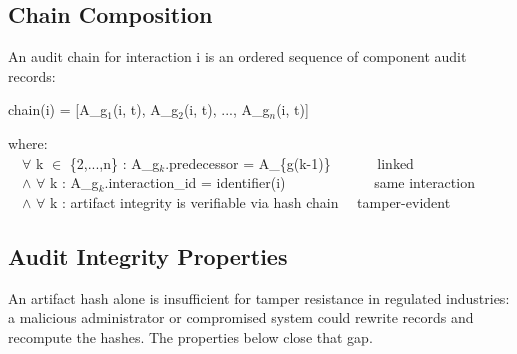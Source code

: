 \subsection{Chain Composition}


\begin{cdef}
An audit chain for interaction i is an ordered sequence of component audit records:

\begin{claddisp}
chain(i) = [A\_g$_1$(i, t), A\_g$_2$(i, t), ..., A\_g$_n$(i, t)]\\
\end{claddisp}
\begin{cladnote}
where:\\
~~$\forall$ k $\in$ \{2,...,n\} : A\_g$_k$.predecessor = A\_\{g(k-1)\}~~~~~~\textemdash{} linked\\
~~$\wedge$ $\forall$ k : A\_g$_k$.interaction\_id = identifier(i)~~~~~~~~~~~~\textemdash{} same interaction\\
~~$\wedge$ $\forall$ k : artifact integrity is verifiable via hash chain~~\textemdash{} tamper-evident\\
\end{cladnote}
\end{cdef}


\subsection{Audit Integrity Properties}


An artifact hash alone is insufficient for tamper resistance in regulated industries: a malicious administrator or compromised system could rewrite records and recompute the hashes. The properties below close that gap.

